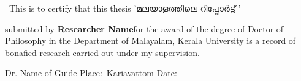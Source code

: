 
\center
\textbf{\LARGE{}}
\vspace{.1in}\newline


\
{\gentium This is to certify that this thesis} {\gayathri'മലയാളത്തിലെ റിപ്പോർട്ട് '} {\gentium submitted by \textbf{Researcher Name}for the award of the degree of Doctor of Philosophy in the Department of Malayalam, Kerala University is a record of bonafied research carried out under my supervision.

\vspace{.5in}
\flushright
Dr. Name of Guide
\flushleft
Place$ :$ Kariavattom
\newline
Date$  :$\hspace*{6.4cm}
}
